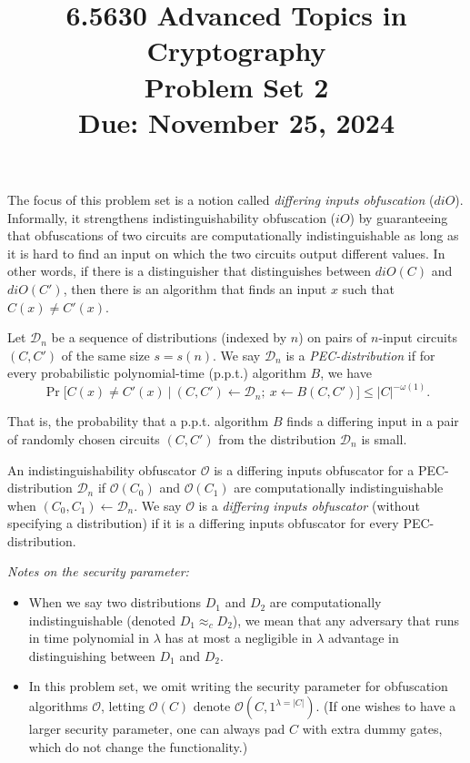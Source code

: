 \documentclass[11pt]{article}
\title{\textbf{6.5630 Advanced Topics in Cryptography} \\ Problem Set 2 \\ Due: November 25, 2024}
\author{}
\date{}
\renewcommand{\O}{\mathcal{O}}
\newcommand{\D}{\mathcal{D}}
\newcommand{\iO}{iO}
\newcommand{\diO}{diO}
\begin{document}
\maketitle

\noindent
The focus of this problem set is a notion called \emph{differing inputs obfuscation} ($\diO$). Informally, it strengthens indistinguishability obfuscation ($\iO$) by guaranteeing that obfuscations of two circuits are  computationally indistinguishable as long as it is hard to find an input on which the two circuits output different values. In other words, if there is a distinguisher that distinguishes between $\diO(C)$ and $\diO(C')$, then there is an algorithm that finds an input $x$ such that $C(x) \neq C'(x)$.

\begin{definition}
    Let $\D_n$ be a sequence of distributions (indexed by $n$) on pairs of $n$-input circuits $(C,C')$ of the same size $s=s(n)$. We say $\D_n$ is a \emph{PEC-distribution} if for every probabilistic polynomial-time (p.p.t.) algorithm $B$, we have
    \[\Pr[C(x) \neq C'(x)\ |\ (C, C') \gets \D_n;\  x \gets B(C, C') ] \leq |C|^{-\omega(1)}.\]
\end{definition}

\noindent
That is, the probability that a p.p.t. algorithm $B$ finds a differing input in a pair of randomly chosen circuits $(C,C')$ from the distribution $\mathcal{D}_n$ is small.

\begin{definition}
    An indistinguishability obfuscator $\O$ is a differing inputs obfuscator for a PEC-distribution $\D_n$ if $\O(C_0)$ and $\O(C_1)$ are computationally indistinguishable when $(C_0, C_1) \gets \D_n$.
    We say $\O$ is a \emph{differing inputs obfuscator} (without specifying a distribution) if it is a differing inputs obfuscator for every PEC-distribution.
\end{definition}
\noindent

\medskip
\noindent
\textit{Notes on the security parameter:}
\begin{itemize}
    \item When we say two distributions $D_1$ and $D_2$ are computationally indistinguishable (denoted $D_1 \approx_c D_2$), we mean that any adversary that runs in time polynomial in $\lambda$ has at most a negligible in $\lambda$ advantage in distinguishing between $D_1$ and $D_2$.

    \item In this problem set, we omit writing the security parameter for obfuscation algorithms $\O$, letting $\O(C)$ denote $\O(C, 1^{\lambda = |C|})$. (If one wishes to have a larger security parameter, one can always pad $C$ with extra dummy gates, which do not change the functionality.)

\end{itemize}
\end{document}
